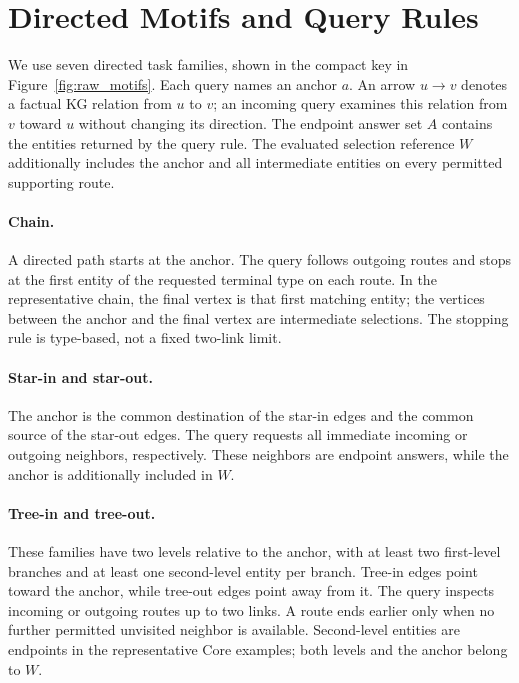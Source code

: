 \section{Directed Motifs and Query Rules}
\label{app:motifs}

We use seven directed task families, shown in the compact key in Figure~\ref{fig:raw_motifs}. Each query names an anchor $a$. An arrow $u\to v$ denotes a factual KG relation from $u$ to $v$; an incoming query examines this relation from $v$ toward $u$ without changing its direction. The endpoint answer set $A$ contains the entities returned by the query rule. The evaluated selection reference $W$ additionally includes the anchor and all intermediate entities on every permitted supporting route.

\paragraph{Chain.}
A directed path starts at the anchor. The query follows outgoing routes and stops at the first entity of the requested terminal type on each route. In the representative chain, the final vertex is that first matching entity; the vertices between the anchor and the final vertex are intermediate selections. The stopping rule is type-based, not a fixed two-link limit.

\paragraph{Star-in and star-out.}
The anchor is the common destination of the star-in edges and the common source of the star-out edges. The query requests all immediate incoming or outgoing neighbors, respectively. These neighbors are endpoint answers, while the anchor is additionally included in $W$.

\paragraph{Tree-in and tree-out.}
These families have two levels relative to the anchor, with at least two first-level branches and at least one second-level entity per branch. Tree-in edges point toward the anchor, while tree-out edges point away from it. The query inspects incoming or outgoing routes up to two links. A route ends earlier only when no further permitted unvisited neighbor is available. Second-level entities are endpoints in the representative Core examples; both levels and the anchor belong to $W$.

